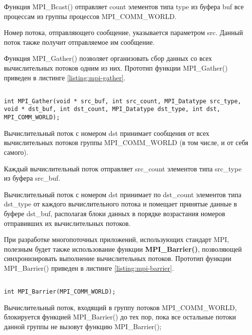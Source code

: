 \begin{itemize}
	Функция MPI\_Bcast() отправляет count элементов типа type из буфера buf все процессам из группы процессов MPI\_COMM\_WORLD.

	Номер потока, отправляющего сообщение, указывается параметром src. Данный поток также получит отправляемое им сообщение.

	Функция MPI\_Gather() позволяет организовать сбор данных со всех вычислительных потоков одним из них. Прототип функции MPI\_Gather() приведен в листинге \ref{listing:mpi-gather}.

\begin{lstlisting}

int MPI_Gather(void * src_buf, int src_count, MPI_Datatype src_type, void * dst_buf, int dst_count, MPI_Datatype dst_type, int dst, MPI_COMM_WORLD);

\end{lstlisting}
\mylistingend

	Вычислительный поток с номером dst принимает сообщения от всех вычислительных потоков группы MPI\_COMM\_WORLD (в том числе, и от себя самого).

	Каждый вычислительный поток отправляет src\_count элементов типа src\_type из буфера src\_buf.

	Вычислительный поток с номером dst принимает по dst\_count элементов типа dst\_type от каждого вычислительного потока и помещает принятые данные в буфере dst\_buf, располагая блоки данных в порядке возрастания номеров отправивших их вычислительных потоков.

\end{itemize}

При разработке многопоточных приложений, использующих стандарт MPI, полезным будет также использование функции {\bf MPI\_Barrier()}, позволяющей синхронизировать выполнение вычислительных потоков. Прототип функции MPI\_Barrier() приведен в листинге \ref{listing:mpi-barrier}.

\begin{lstlisting}

int MPI_Barrier(MPI_COMM_WORLD);

\end{lstlisting}
\mylistingend

Вычислительный поток, входящий в группу потоков MPI\_COMM\_WORLD, блокируется функцией MPI\_Barrier() до тех пор, пока все остальные потоки данной группы не вызовут функцию MPI\_Barrier();

